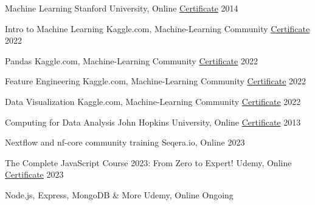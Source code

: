

\begin{cvhonors}

  \cvhonor
    {Machine Learning} %
    {Stanford University, Online} %
    {\href{http://tinyurl.com/v5ytdzhs}{Certificate}} %
    {2014} %

  \cvhonor
    {Intro to Machine Learning} %
    {Kaggle.com, Machine-Learning Community} %
    {\href{https://tinyurl.com/3t9xuxdy}{Certificate}} %
    {2022} %

  \cvhonor
    {Pandas} %
    {Kaggle.com, Machine-Learning Community} %
    {\href{https://tinyurl.com/4ec7n95c}{Certificate}} %
    {2022} %

  \cvhonor
    {Feature Engineering} %
    {Kaggle.com, Machine-Learning Community} %
    {\href{https://tinyurl.com/2u7kbxyh}{Certificate}} %
    {2022} %

  \cvhonor
    {Data Visualization} %
    {Kaggle.com, Machine-Learning Community} %
    {\href{https://tinyurl.com/bdee5xwk}{Certificate}} %
    {2022} %

  \cvhonor
    {Computing for Data Analysis} %
    {John Hopkins University, Online} %
    {\href{http://tinyurl.com/2ez3unkj}{Certificate}} %
    {2013} %

\cvhonor
    {Nextflow and nf-core community training} %
    {Seqera.io, Online} %
    {} %
    {2023} %

\cvhonor
    {The Complete JavaScript Course 2023: From Zero to Expert!} %
    {Udemy, Online } %
    {\href{https://tinyurl.com/mrxc5h3x}{Certificate}} %
    {2023} %

\cvhonor
    {Node.js, Express, MongoDB \& More} %
    {Udemy, Online } %
    {} %
    {Ongoing} %

\end{cvhonors}